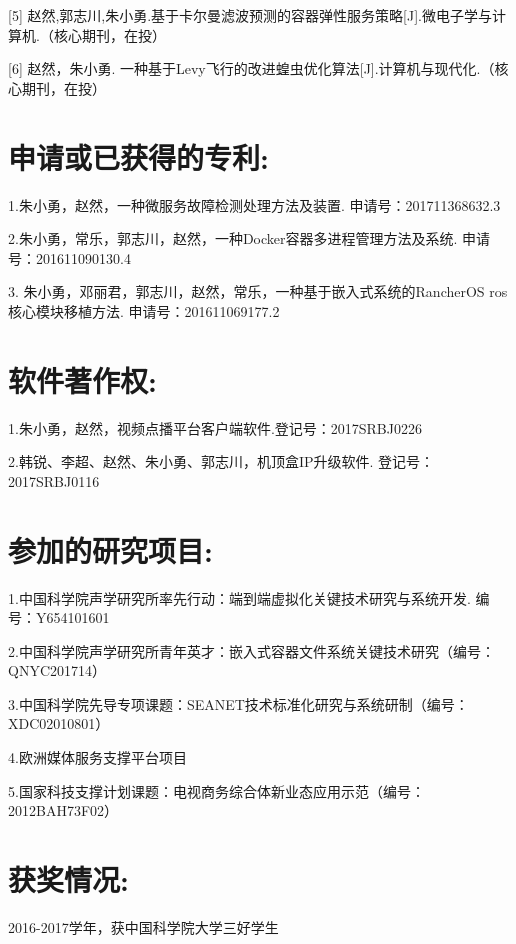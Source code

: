 [5] 赵然,郭志川,朱小勇.基于卡尔曼滤波预测的容器弹性服务策略[J].微电子学与计算机.（核心期刊，在投）

[6] 赵然，朱小勇. 一种基于Levy飞行的改进蝗虫优化算法[J].计算机与现代化.（核心期刊，在投）

\section*{申请或已获得的专利:}

1.朱小勇，赵然，一种微服务故障检测处理方法及装置. 申请号：201711368632.3

2.朱小勇，常乐，郭志川，赵然，一种Docker容器多进程管理方法及系统. 申请号：201611090130.4

3. 朱小勇，邓丽君，郭志川，赵然，常乐，一种基于嵌入式系统的RancherOS ros核心模块移植方法. 申请号：201611069177.2

\section*{软件著作权:}

1.朱小勇，赵然，视频点播平台客户端软件.登记号：2017SRBJ0226

2.韩锐、李超、赵然、朱小勇、郭志川，机顶盒IP升级软件. 登记号：2017SRBJ0116

\section*{参加的研究项目:}

1.中国科学院声学研究所率先行动：端到端虚拟化关键技术研究与系统开发. 编号：Y654101601

2.中国科学院声学研究所青年英才：嵌入式容器文件系统关键技术研究（编号：QNYC201714）

3.中国科学院先导专项课题：SEANET技术标准化研究与系统研制（编号：XDC02010801）

4.欧洲媒体服务支撑平台项目

5.国家科技支撑计划课题：电视商务综合体新业态应用示范（编号：2012BAH73F02）

\section*{获奖情况:}
2016-2017学年，获中国科学院大学三好学生

\cleardoublepage[plain]%

